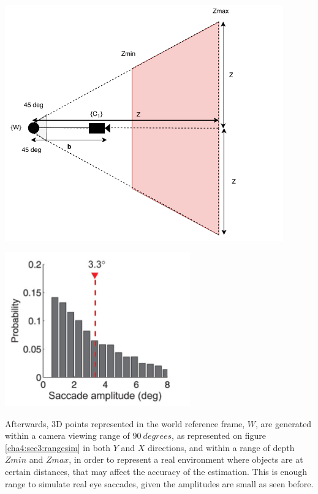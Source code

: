 \begin{minipage}{0.5\textwidth}
	\centering
	\includegraphics[width=0.9\textwidth]{images/rangesim.pdf}
	\label{cha4:sec3:rangesim}
\end{minipage}
\begin{minipage}{0.5\textwidth}
	\centering
	\includegraphics[width=0.6\textwidth]{images/freeview.png}
	\label{cha4:sec3:freeview}
\end{minipage}

Afterwards, 3D points represented in the world reference frame, ${W}$, are generated within a camera viewing range of $90 \ degrees$, as represented on figure \ref{cha4:sec3:rangesim} in both $Y$ and $X$ directions, and within a range of depth $Zmin$ and $Zmax$, in order to represent a real environment where objects are at certain distances, that may affect the accuracy of the estimation. This is enough range to simulate real eye saccades, given the amplitudes are small as seen before. 

